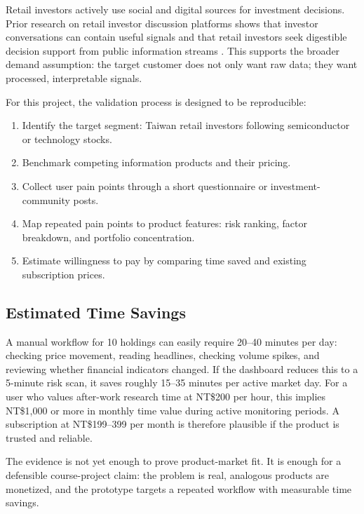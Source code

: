 Retail investors actively use social and digital sources for investment decisions. Prior research on retail investor discussion platforms shows that investor conversations can contain useful signals and that retail investors seek digestible decision support from public information streams \citep{stockbabble}. This supports the broader demand assumption: the target customer does not only want raw data; they want processed, interpretable signals.

For this project, the validation process is designed to be reproducible:

\begin{enumerate}
    \item Identify the target segment: Taiwan retail investors following semiconductor or technology stocks.
    \item Benchmark competing information products and their pricing.
    \item Collect user pain points through a short questionnaire or investment-community posts.
    \item Map repeated pain points to product features: risk ranking, factor breakdown, and portfolio concentration.
    \item Estimate willingness to pay by comparing time saved and existing subscription prices.
\end{enumerate}

\subsection{Estimated Time Savings}

A manual workflow for 10 holdings can easily require 20--40 minutes per day: checking price movement, reading headlines, checking volume spikes, and reviewing whether financial indicators changed. If the dashboard reduces this to a 5-minute risk scan, it saves roughly 15--35 minutes per active market day. For a user who values after-work research time at NT\$200 per hour, this implies NT\$1,000 or more in monthly time value during active monitoring periods. A subscription at NT\$199--399 per month is therefore plausible if the product is trusted and reliable.

The evidence is not yet enough to prove product-market fit. It is enough for a defensible course-project claim: the problem is real, analogous products are monetized, and the prototype targets a repeated workflow with measurable time savings.

